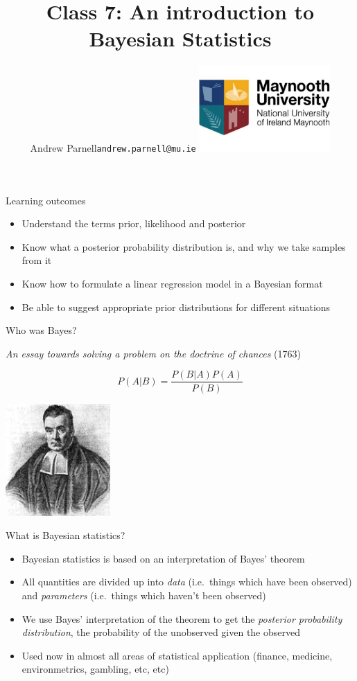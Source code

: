 \documentclass[ignorenonframetext,]{beamer}
\title{Class 7: An introduction to Bayesian Statistics}
\author{Andrew Parnell\newline \texttt{andrew.parnell@mu.ie}
\newline \vspace{1cm} \newline \includegraphics[width=5cm]{MU_logo.jpg}}
\date{}
\providecommand{\tightlist}{%
  \setlength{\itemsep}{0pt}\setlength{\parskip}{0pt}}
\begin{document}
\frame{\titlepage}

\begin{frame}{Learning outcomes}

\begin{itemize}
\tightlist
\item
  Understand the terms prior, likelihood and posterior
\item
  Know what a posterior probability distribution is, and why we take
  samples from it
\item
  Know how to formulate a linear regression model in a Bayesian format
\item
  Be able to suggest appropriate prior distributions for different
  situations
\end{itemize}

\end{frame}

\begin{frame}{Who was Bayes?}

\emph{An essay towards solving a problem on the doctrine of chances}
(1763)

\[P(A|B) = \frac{P(B|A) P(A)}{P(B)}\]

\begin{center}
\includegraphics[width=4cm]{Thomas_Bayes.pdf}
\end{center}

\end{frame}

\begin{frame}{What is Bayesian statistics?}

\begin{itemize}
\tightlist
\item
  Bayesian statistics is based on an interpretation of Bayes' theorem
\item
  All quantities are divided up into \emph{data} (i.e.~things which have
  been observed) and \emph{parameters} (i.e.~things which haven't been
  observed)
\item
  We use Bayes' interpretation of the theorem to get the \emph{posterior
  probability distribution}, the probability of the unobserved given the
  observed
\item
  Used now in almost all areas of statistical application (finance,
  medicine, environmetrics, gambling, etc, etc)
\end{itemize}

\end{frame}
\end{document}
